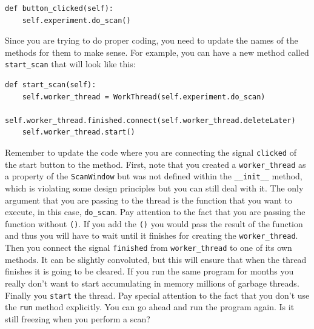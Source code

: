 \begin{verbatim}
def button_clicked(self):
    self.experiment.do_scan()
\end{verbatim}

Since you are trying to do proper coding, you need to update the names
of the methods for them to make sense. For example, you can have a new
method called \texttt{start_scan} that will look like this:

\begin{verbatim}
def start_scan(self):
    self.worker_thread = WorkThread(self.experiment.do_scan)
    self.worker_thread.finished.connect(self.worker_thread.deleteLater)
    self.worker_thread.start()
\end{verbatim}

Remember to update the code where you are connecting the signal
\texttt{clicked} of the start button to the method. First, note that you
created a \texttt{worker_thread} as a property of the
\texttt{ScanWindow} but was not defined within the \texttt{__init__}
method, which is violating some design principles but you can still deal
with it. The only argument that you are passing to the thread is the
function that you want to execute, in this case, \texttt{do_scan}. Pay
attention to the fact that you are passing the function without
\texttt{()}. If you add the \texttt{()} you would pass the result of the
function and thus you will have to wait until it finishes for creating
the \texttt{worker\_thread}. Then you connect the signal
\texttt{finished} from \texttt{worker_thread} to one of its own
methods. It can be slightly convoluted, but this will ensure that when
the thread finishes it is going to be cleared. If you run the same
program for months you really don't want to start accumulating in memory
millions of garbage threads. Finally you \texttt{start} the thread. Pay
special attention to the fact that you don't use the \texttt{run} method
explicitly. You can go ahead and run the program again. Is it still
freezing when you perform a scan?



